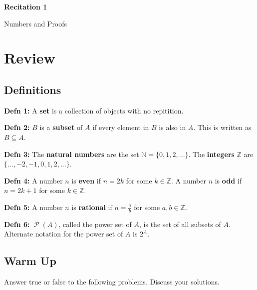 \documentclass[12pt,letterpaper]{article}
\newcommand\N{\mathbb N}
\newcommand\Z{\mathbb Z}
\newcommand\Pow{\ensuremath{\operatorname{\mathcal{P}}}}
\begin{document}
  \thispagestyle{firstpagestyle}
  \begin{center}
    {\large \textbf{Recitation 1}}
    
    {\large Numbers and Proofs}
  \end{center}
  
  

      \section*{Review}

      \subsection*{Definitions}
      \textbf{Defn 1:} A \textbf{set} is a collection of objects with no repitition.

      \textbf{Defn 2:} $B$ is a \textbf{subset} of $A$ if every element in $B$ is also in $A$. This is written as $B \subseteq A$.

      \textbf{Defn 3:} The \textbf{natural numbers} are the set $\N = \{0,1,2,...\}$. The \textbf{integers} $\Z$ are  $\{..., -2, -1, 0, 1, 2, ...\}$.

      \textbf{Defn 4:} A number $n$ is \textbf{even} if $n = 2k$ for some $k \in \Z$. A number $n$ is \textbf{odd} if $n = 2k + 1$ for some $k \in \Z$.

      \textbf{Defn 5:} A number $n$ is \textbf{rational} if $n = \frac{a}{b}$ for some $a,b \in \Z$. 

	\textbf{Defn 6:} $\Pow{(A)}$, called the power set of $A$, is the set of all subsets of $A$. Alternate notation for the power set of $A$ is $2^A$.

      \subsection*{Warm Up}

      Answer true or false to the following problems. Discuss your solutions.
\end{document}
